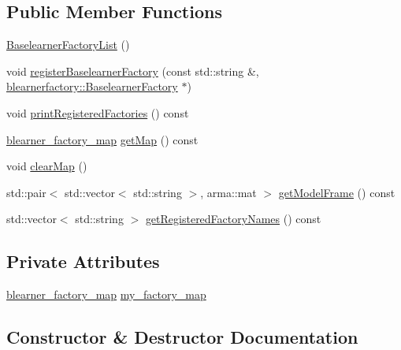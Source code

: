 \subsection*{Public Member Functions}
\begin{DoxyCompactItemize}
\item 
\hyperlink{classblearnerlist_1_1_baselearner_factory_list_a438e2cfeecfdecaff27624225819f99b}{Baselearner\+Factory\+List} ()
\item 
void \hyperlink{classblearnerlist_1_1_baselearner_factory_list_a6f5d8eb26f5f5ae4856d62eb9d649f4f}{register\+Baselearner\+Factory} (const std\+::string \&, \hyperlink{classblearnerfactory_1_1_baselearner_factory}{blearnerfactory\+::\+Baselearner\+Factory} $\ast$)
\item 
void \hyperlink{classblearnerlist_1_1_baselearner_factory_list_acb3436a781eaa830ee53f1d7d9009263}{print\+Registered\+Factories} () const
\item 
\hyperlink{baselearner__factory__list_8h_a058570e00ae11b882cfed36eb40be025}{blearner\+\_\+factory\+\_\+map} \hyperlink{classblearnerlist_1_1_baselearner_factory_list_aeb573190a689af611e2f80ca8ed65d95}{get\+Map} () const
\item 
void \hyperlink{classblearnerlist_1_1_baselearner_factory_list_aacbe97968ca672d2481d5f8dce0bbf94}{clear\+Map} ()
\item 
std\+::pair$<$ std\+::vector$<$ std\+::string $>$, arma\+::mat $>$ \hyperlink{classblearnerlist_1_1_baselearner_factory_list_a1f0d601a978c0f50cf9b6228c1f92ce8}{get\+Model\+Frame} () const
\item 
std\+::vector$<$ std\+::string $>$ \hyperlink{classblearnerlist_1_1_baselearner_factory_list_ac4dc76e908affe9aae7b7278cec22875}{get\+Registered\+Factory\+Names} () const
\end{DoxyCompactItemize}
\subsection*{Private Attributes}
\begin{DoxyCompactItemize}
\item 
\hyperlink{baselearner__factory__list_8h_a058570e00ae11b882cfed36eb40be025}{blearner\+\_\+factory\+\_\+map} \hyperlink{classblearnerlist_1_1_baselearner_factory_list_a839e9b3f1bf73e995c35f7a6d0f64113}{my\+\_\+factory\+\_\+map}
\end{DoxyCompactItemize}


\subsection{Constructor \& Destructor Documentation}
\mbox{\label{classblearnerlist_1_1_baselearner_factory_list_a438e2cfeecfdecaff27624225819f99b}} 
